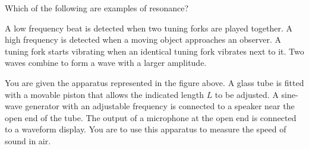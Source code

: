 \documentclass{../../../oss-ap12ibhl-print}
\begin{document}
\begin{questions}
    
  \question Which of the following are examples of resonance?
  \label{multi-last}
  \begin{choices}
    \choice A low frequency beat is detected when two tuning forks are played
    together.
    \choice A high frequency is detected when a moving object approaches an
    observer.
    \choice A tuning fork starts vibrating when an identical tuning fork
    vibrates next to it.
    \choice Two waves combine to form a wave with a larger amplitude.
  \end{choices}
  \newpage


  \question You are given the apparatus represented in the figure above. A
  glass tube is fitted with a movable piston that allows the indicated length
  $L$ to be adjusted. A sine-wave generator with an adjustable frequency is
  connected to a speaker near the open end of the tube. The output of a
  microphone at the open end is connected to a waveform display. You are to use
  this apparatus to measure the speed of sound in air.
\end{questions}
\end{document}
